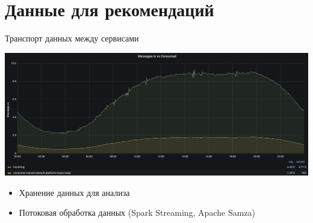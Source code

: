 \documentclass[11pt,aspectratio=169]{beamer}
\newcommand{\vkitem}{\item[\color{vk}$\bullet$]}
\begin{document}
\section{Данные для рекомендаций}

{
\begin{frame}[plain]
\end{frame}
}

\begin{frame}{Транспорт данных между сервисами}

\begin{center}
\includegraphics[scale=0.25]{images/music-activity.png}
\end{center}

\begin{itemize}[<+->]
\vkitem Хранение данных для анализа
\vkitem Потоковая обработка данных (Spark Streaming, Apache Samza)
\end{itemize}

\end{frame}
\end{document}
